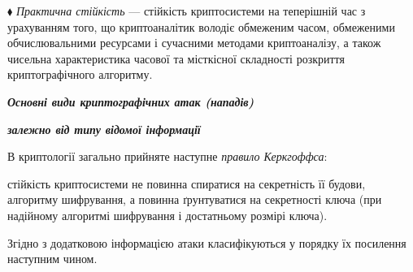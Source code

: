 ${\blacklozenge}$ \textit{Практична стійкість }--- стійкість криптосистеми на
теперішній час з урахуванням того, що криптоаналітик володіє обмеженим часом,
обмеженими обчислювальними ресурсами і сучасними методами криптоаналізу,  а
також чисельна характеристика часової та місткісної складності розкриття
криптографічного алгоритму. 


\bigskip


\bigskip

{\centering\bfseries\itshape
Основні види криптографічних атак (нападів)
\par}

{\centering\bfseries\itshape
 залежно від типу відомої інформації
\par}


\bigskip


\bigskip

В криптології загально прийняте  наступне \textit{правило Керкгоффса}: 

 стійкість криптосистеми не повинна спиратися на секретність її будови,
алгоритму шифрування,  а повинна ґрунтуватися на секретності ключа (при
надійному алгоритмі шифрування і достатньому розмірі ключа). 

Згідно з додатковою інформацією атаки класифікуються у порядку їх посилення
наступним чином.


